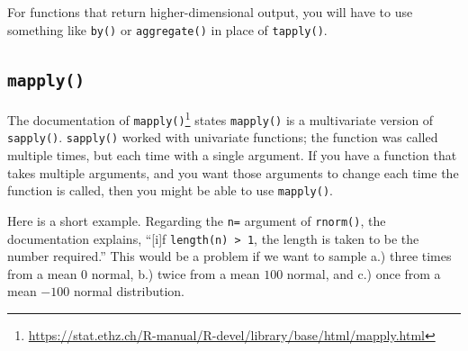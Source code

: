 \documentclass[
  12pt,
]{krantz}
\makeatletter
\newenvironment{Shaded}{\begin{snugshade}}{\end{snugshade}}
\newcommand{\DocumentationTok}[1]{\textcolor[rgb]{0.37,0.37,0.37}{\textbf{\textit{#1}}}}
\newcommand{\FunctionTok}[1]{\textcolor[rgb]{0,0,0}{#1}}
\newcommand{\NormalTok}[1]{#1}
\newcommand{\SpecialCharTok}[1]{\textcolor[rgb]{0,0,0}{#1}}
\renewcommand{\href}[2]{#2\footnote{\url{#1}}}
\newenvironment{kframe}{%
\medskip{}
\setlength{\fboxsep}{.8em}
 \def\at@end@of@kframe{}%
 \ifinner\ifhmode%
  \def\at@end@of@kframe{\end{minipage}}%
  \begin{minipage}{\columnwidth}%
 \fi\fi%
 \def\FrameCommand##1{\hskip\@totalleftmargin \hskip-\fboxsep
 \colorbox{shadecolor}{##1}\hskip-\fboxsep
     \hskip-\linewidth \hskip-\@totalleftmargin \hskip\columnwidth}%
 \MakeFramed {\advance\hsize-\width
   \@totalleftmargin\z@ \linewidth\hsize
   \@setminipage}}%
 {\par\unskip\endMakeFramed%
 \at@end@of@kframe}
\renewenvironment{Shaded}{\begin{kframe}}{\end{kframe}}
\makeatother
\begin{document}
\begin{Shaded}
\end{Shaded}

For functions that return higher-dimensional output, you will have to use something like \texttt{by()} or \texttt{aggregate()} in place of \texttt{tapply()}.

\hypertarget{mapply}{%
\subsection{\texorpdfstring{\texttt{mapply()}}{mapply()}}\label{mapply}}

The \href{https://stat.ethz.ch/R-manual/R-devel/library/base/html/mapply.html}{documentation of \texttt{mapply()}} states \texttt{mapply()} is a multivariate version of \texttt{sapply()}. \texttt{sapply()} worked with univariate functions; the function was called multiple times, but each time with a single argument. If you have a function that takes multiple arguments, and you want those arguments to change each time the function is called, then you might be able to use \texttt{mapply()}.

Here is a short example. Regarding the \texttt{n=} argument of \texttt{rnorm()}, the documentation explains, ``{[}i{]}f \texttt{length(n)\ \textgreater{}\ 1}, the length is taken to be the number required.'' This would be a problem if we want to sample a.) three times from a mean \(0\) normal, b.) twice from a mean \(100\) normal, and c.) once from a mean \(-100\) normal distribution.
\end{document}
